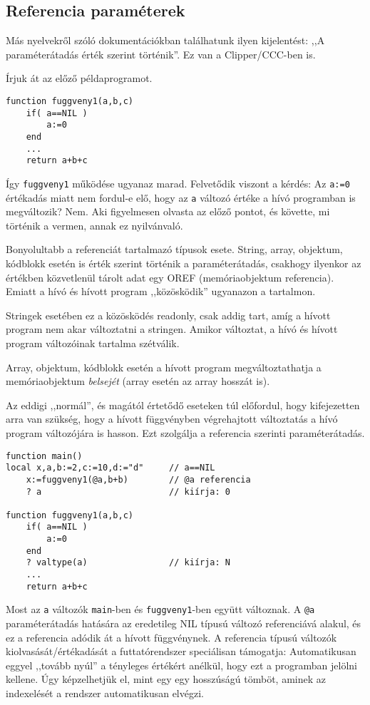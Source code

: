 \subsection{Referencia paraméterek}

Más nyelvekről szóló dokumentációkban találhatunk ilyen kijelentést:
,,A paraméterátadás érték szerint történik''. Ez van a Clipper/CCC-ben is.

Írjuk át az előző példaprogramot.
\begin{verbatim}
function fuggveny1(a,b,c)
    if( a==NIL )
        a:=0
    end
    ...
    return a+b+c
\end{verbatim}
Így \verb!fuggveny1! működése ugyanaz marad.
Felvetődik viszont a kérdés: Az \verb!a:=0! értékadás miatt nem fordul-e elő,
hogy az \verb!a! változó értéke a hívó programban is megváltozik? Nem. 
Aki figyelmesen olvasta az előző pontot, és követte, mi történik a vermen,
annak ez nyilvánvaló.

Bonyolultabb a referenciát tartalmazó típusok esete. 
String, array, objektum, kódblokk esetén is érték szerint történik a paraméterátadás, 
csakhogy ilyenkor az értékben közvetlenül tárolt adat egy OREF 
(memóriaobjektum referencia). Emiatt a hívó és hívott program ,,közösködik''
ugyanazon a tartalmon. 

Stringek esetében ez a közösködés readonly,  csak addig tart,
amíg a hívott program nem akar változtatni a stringen. Amikor változtat,
a hívó és hívott program változóinak tartalma szétválik.

Array, objektum, kódblokk esetén a hívott program megváltoztathatja
a memóriaobjektum {\em belsejét\/} (array esetén az array hosszát is).

Az eddigi ,,normál'', és magától értetődő eseteken túl előfordul, 
hogy kifejezetten arra van szükség, 
hogy a hívott függvényben végrehajtott változtatás
a hívó program változójára is hasson. 
Ezt szolgálja a referencia szerinti paraméterátadás.

\begin{verbatim}
function main()
local x,a,b:=2,c:=10,d:="d"     // a==NIL
    x:=fuggveny1(@a,b+b)        // @a referencia
    ? a                         // kiírja: 0

function fuggveny1(a,b,c)
    if( a==NIL )
        a:=0
    end
    ? valtype(a)                // kiírja: N
    ...
    return a+b+c
\end{verbatim}

Most az \verb!a! változók \verb!main!-ben és \verb!fuggveny1!-ben együtt változnak.
A \verb!@a! paraméterátadás hatására az eredetileg NIL típusú változó referenciává
alakul, és ez a referencia adódik át a hívott függvénynek. 
A referencia típusú változók kiolvasását/értékadását a futtatórendszer
speciálisan támogatja: Automatikusan eggyel ,,tovább nyúl'' a tényleges
értékért anélkül, hogy ezt a programban jelölni kellene. Úgy képzelhetjük el, 
mint egy egy hosszúságú tömböt, aminek az indexelését a rendszer automatikusan
elvégzi.

